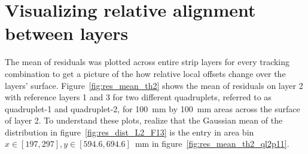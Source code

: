 \section{Visualizing relative alignment between layers}

The mean of residuals was plotted across entire strip layers for every tracking combination to get a picture of the how relative local offsets change over the layers' surface. Figure~\ref{fig:res_mean_th2} shows the mean of residuals on layer 2 with reference layers 1 and 3 for two different quadruplets, referred to as quadruplet-1 and quadruplet-2, for \SI{100}{mm} by \SI{100}{mm} areas across the surface of layer 2. To understand these plots, realize that the Gaussian mean of the distribution in figure~\ref{fig:res_dist_L2_F13} is the entry in area bin $x\in\left[197, 297\right],  y\in\left[594.6, 694.6\right]$~mm in figure~\ref{fig:res_mean_th2_ql2p11}.

